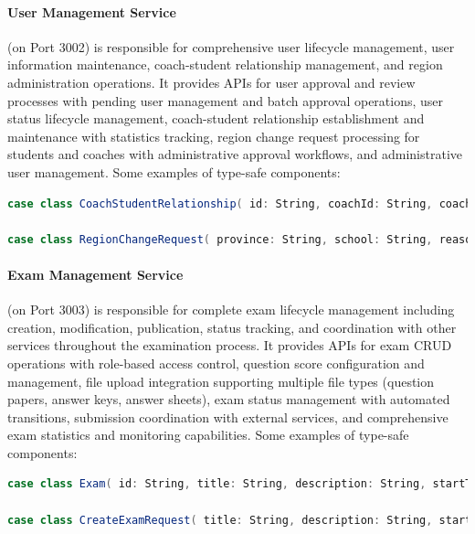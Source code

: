\documentclass[12pt]{article}
\begin{document}
\paragraph{User Management Service} (on Port 3002) is responsible for comprehensive user lifecycle management, user information maintenance, coach-student relationship management, and region administration operations. It provides APIs for user approval and review processes with pending user management and batch approval operations, user status lifecycle management, coach-student relationship establishment and maintenance with statistics tracking, region change request processing for students and coaches with administrative approval workflows, and administrative user management. Some examples of type-safe components:

\begin{lstlisting}[language=Scala]
case class CoachStudentRelationship( id: String, coachId: String, coachUsername: String, coachName: Option[String], studentId: String, studentUsername: String, studentName: Option[String], createdAt: LocalDateTime )

case class RegionChangeRequest( province: String, school: String, reason: String )
\end{lstlisting}

\paragraph{Exam Management Service} (on Port 3003) is responsible for complete exam lifecycle management including creation, modification, publication, status tracking, and coordination with other services throughout the examination process. It provides APIs for exam CRUD operations with role-based access control, question score configuration and management, file upload integration supporting multiple file types (question papers, answer keys, answer sheets), exam status management with automated transitions, submission coordination with external services, and comprehensive exam statistics and monitoring capabilities. Some examples of type-safe components:

\begin{lstlisting}[language=Scala]
case class Exam( id: String, title: String, description: String, startTime: LocalDateTime, endTime: LocalDateTime, status: ExamStatus, createdAt: LocalDateTime, updatedAt: LocalDateTime, duration: Option[Int] = None, questionFile: Option[ExamFile] = None, answerFile: Option[ExamFile] = None, answerSheetFile: Option[ExamFile] = None, createdBy: String, participants: List[String] = List.empty, totalQuestions: Option[Int] = None, maxScore: Option[Double] = None, totalScore: Option[Double] = None, subject: Option[String] = None, instructions: Option[String] = None )

case class CreateExamRequest( title: String, description: String, startTime: LocalDateTime, endTime: LocalDateTime, totalQuestions: Int, duration: Int, status: ExamStatus = ExamStatus.Draft, totalScore: Option[Double] = None, questions: Option[List[CreateExamQuestionRequest]] = None )
\end{lstlisting}
\end{document}
